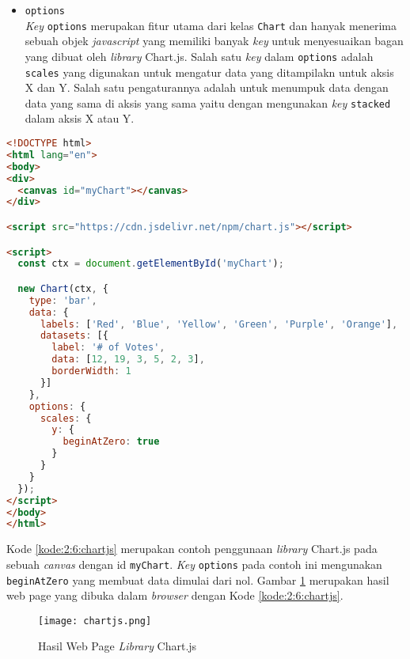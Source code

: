 \begin{itemize}
	\item \verb|options| \\
	\textit{Key} \verb|options| merupakan fitur utama dari kelas \verb|Chart| dan hanyak menerima sebuah objek \textit{javascript} yang memiliki banyak \textit{key} untuk menyesuaikan bagan yang dibuat oleh \textit{library} Chart.js. Salah satu \textit{key} dalam \verb|options| adalah \verb|scales| yang digunakan untuk mengatur data yang ditampilakn untuk aksis X dan Y. Salah satu pengaturannya adalah untuk menumpuk data dengan data yang sama di aksis yang sama yaitu dengan mengunakan \textit{key} \verb|stacked| dalam aksis X atau Y.
\end{itemize}

\begin{lstlisting}[language={html}, caption={Contoh kode pengunaan Chart.js}, label={kode:2:6:chartjs}]
<!DOCTYPE html>
<html lang="en">
<body>
<div>
  <canvas id="myChart"></canvas>
</div>

<script src="https://cdn.jsdelivr.net/npm/chart.js"></script>

<script>
  const ctx = document.getElementById('myChart');

  new Chart(ctx, {
    type: 'bar',
    data: {
      labels: ['Red', 'Blue', 'Yellow', 'Green', 'Purple', 'Orange'],
      datasets: [{
        label: '# of Votes',
        data: [12, 19, 3, 5, 2, 3],
        borderWidth: 1
      }]
    },
    options: {
      scales: {
        y: {
          beginAtZero: true
        }
      }
    }
  });
</script>
</body>
</html>
\end{lstlisting}

Kode \ref{kode:2:6:chartjs} merupakan contoh penggunaan \textit{library} Chart.js pada sebuah \textit{canvas} dengan id \verb|myChart|. \textit{Key} \verb|options| pada contoh ini mengunakan \verb|beginAtZero| yang membuat data dimulai dari nol. Gambar \ref{fig:2:6:chartjs} merupakan hasil web page yang dibuka dalam \textit{browser} dengan Kode \ref{kode:2:6:chartjs}.

\begin{figure}[H]
	\centering
	\texttt{[image: chartjs.png]}
	\caption{Hasil Web Page \textit{Library} Chart.js}
	\label{fig:2:6:chartjs}
\end{figure}
